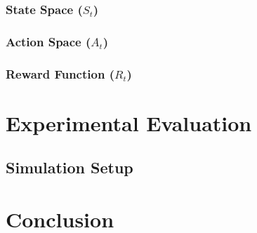 \documentclass[iicol]{sn-jnl}
\begin{document}
\subsubsection{State Space ($S_t$)}

\subsubsection{Action Space ($A_t$)}

\subsubsection{Reward Function ($R_t$)}

\section{Experimental Evaluation}\label{sec_experiments}

\subsection{Simulation Setup}


\section{Conclusion}\label{sec_conclusion}



\end{document}
